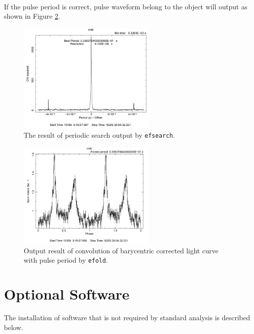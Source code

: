 \documentclass[10pt]{report}
\renewcommand{\_}{\textscale{.5}{\textbf{\textunderscore}}}
\begin{document}
\

If the pulse period is correct, pulse waveform belong to the object will output as shown in Figure \ref{fig:7}. \\

\begin{figure}[hbtp!]
  \centering
  \includegraphics[width=0.6\textwidth]{4_6.png}
  \caption{The result of periodic search output by \texttt{efsearch}.}
  \label{fig:6}
\end{figure}

\begin{figure}[hbtp!]
  \centering
  \includegraphics[width=0.6\textwidth]{4_7.png}
  \caption{Output result of convolution of barycentric corrected light curve with pulse period by \texttt{efold}.}
  \label{fig:7}
\end{figure}

\clearpage

\appendix

\chapter{Optional Software}\label{app:1}

The installation of software that is not required by standard analysis is described below. \\
\end{document}
